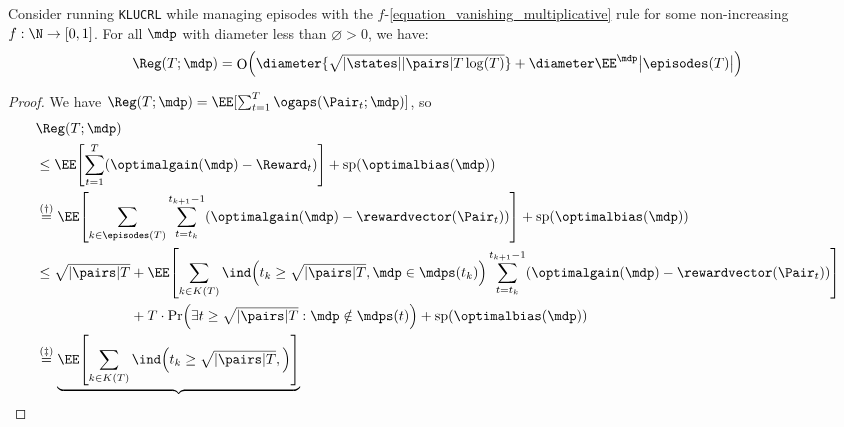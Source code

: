 \documentclass[preprint,cleveref,12pt]{colt2025}
\DeclarePairedDelimiter{\brackets}{[}{]}	%
\DeclarePairedDelimiter{\parens}{(}{)}	%
\DeclarePairedDelimiter{\abs}{\lvert}{\rvert}	%
\newcommand{\tsqrt}[1]{{\textstyle\sqrt{#1}}} %
\newcommand{\eqindicator}[1]{\ind\parens*{#1}}
\newcommand{\vecspan}[1]{\mathrm{sp}\parens{#1}}
\DeclareMathOperator*{\OH}{\mathrm{O}}
\def\model{\mdp}
\def\models{\mdps}
\def\reward{\rewardvector}
\def\optgain{\optimalgain} %
\def\optbias{\optimalbias} %
\begin{document}
    \begin{lemma}
    \label{lemma_minimax_regret_episodes}
        Consider running \texttt{KLUCRL} while managing episodes with the $f$-\eqref{equation_vanishing_multiplicative} rule for some non-increasing $f : \N \to [0, 1]$.
        For all $\model$ with diameter less than $\diameter > 0$, we have:
        \begin{equation*}
            \Reg(T; \model) 
            =
            \OH \parens*{
                \diameter \tsqrt{\abs{\states}\abs{\pairs} T \log(T)}
                + \diameter \EE^{\model}\abs[\big]{\episodes(T)}
            }
        \end{equation*}
    \end{lemma}
    \begin{proof}
        We have $\Reg(T; \model) = \EE[\sum_{t=1}^T \ogaps(\Pair_t; \model)]$, so
        \begin{align*}
            & \Reg(T; \model)
            \\
            & \le
            \EE \brackets*{
                \sum_{t=1}^T 
                (\optgain(\model) - \Reward_t)
            } 
            + \vecspan{\optbias(\model)}
            \\
            & \overset{(\dagger)}=
            \EE \brackets*{
                \sum_{k \in \episodes(T)}
                \sum_{t = t_k}^{t_{k+1} - 1}
                (\optgain(\model) - \reward(\Pair_t))
            }
            + \vecspan{\optbias(\model)}
            \\
            & \le 
            \tsqrt{\abs{\pairs} T}
            +
            \EE \brackets*{
                \sum_{k \in K(T)}
                \eqindicator{
                    t_k \ge \tsqrt{\abs{\pairs} T}
                    ,
                    \model \in \models(t_k)
                }
                \sum_{t = t_k}^{t_{k+1} - 1}
                (\optgain(\model) - \reward(\Pair_t))
            }
            \\
            & \phantom{{} \le \tsqrt{\abs{\pairs}T}}
            +
            T \cdot \Pr \parens*{
                \exists t \ge \tsqrt{\abs{\pairs}T} 
                :
                \model \notin \models(t)
            }
            + \vecspan{\optbias(\model)}
            \\
            & \overset{(\ddagger)}=
            \underbrace{
                \EE \brackets*{
                    \sum_{k \in K(T)}
                    \eqindicator{
                        t_k \ge \tsqrt{\abs{\pairs}T}
                        ,
}}}
\end{align*}
\end{proof}
\end{document}

